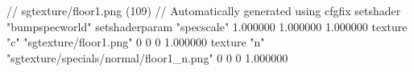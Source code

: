 // sgtexture/floor1.png (109)
// Automatically generated using cfgfix
setshader "bumpspecworld"
setshaderparam "specscale" 1.000000 1.000000 1.000000
texture "c" "sgtexture/floor1.png" 0 0 0 1.000000
texture "n" "sgtexture/specials/normal/floor1_n.png" 0 0 0 1.000000

